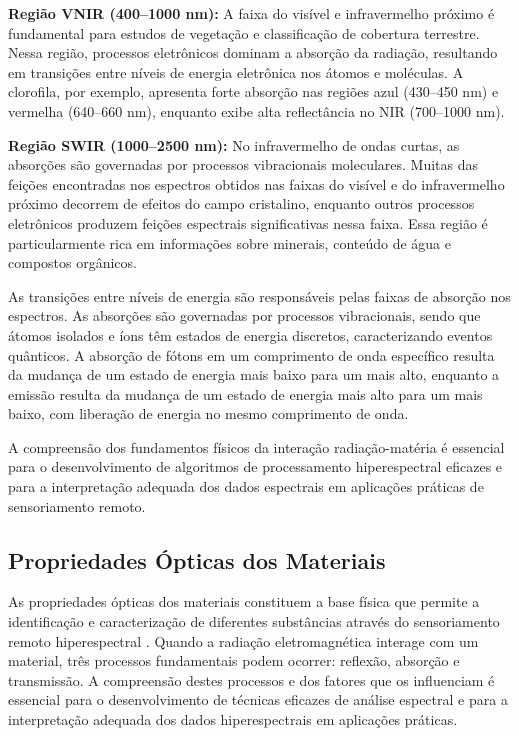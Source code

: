 \textbf{Região VNIR (400--1000 nm):} A faixa do visível e infravermelho
próximo é fundamental para estudos de vegetação e classificação de cobertura
terrestre. Nessa região, processos eletrônicos dominam a absorção da radiação,
resultando em transições entre níveis de energia eletrônica nos átomos e
moléculas. A clorofila, por exemplo, apresenta forte absorção nas regiões azul
(430--450 nm) e vermelha (640--660 nm), enquanto exibe alta reflectância no NIR
(700--1000 nm).

\textbf{Região SWIR (1000--2500 nm):} No infravermelho de ondas curtas, as
absorções são governadas por processos vibracionais moleculares. Muitas das
feições encontradas nos espectros obtidos nas faixas do visível e do
infravermelho próximo decorrem de efeitos do campo cristalino, enquanto outros
processos eletrônicos produzem feições espectrais significativas nessa faixa.
Essa região é particularmente rica em informações sobre minerais, conteúdo de
água e compostos orgânicos.

As transições entre níveis de energia são responsáveis pelas faixas de absorção
nos espectros. As absorções são governadas por processos vibracionais, sendo
que átomos isolados e íons têm estados de energia discretos, caracterizando
eventos quânticos. A absorção de fótons em um comprimento de onda específico
resulta da mudança de um estado de energia mais baixo para um mais alto,
enquanto a emissão resulta da mudança de um estado de energia mais alto para um
mais baixo, com liberação de energia no mesmo comprimento de onda.

A compreensão dos fundamentos físicos da interação radiação-matéria é essencial
para o desenvolvimento de algoritmos de processamento hiperespectral eficazes e
para a interpretação adequada dos dados espectrais em aplicações práticas de
sensoriamento remoto.


\subsection{Propriedades Ópticas dos Materiais}
\label{subsec:propriedades_opticas}

As propriedades ópticas dos materiais constituem a base física que permite 
a identificação e caracterização de diferentes substâncias através do 
sensoriamento remoto hiperespectral \cite{Baptista2019}. Quando a 
radiação eletromagnética interage com um material, três processos 
fundamentais podem ocorrer: reflexão, absorção e transmissão. A compreensão 
destes processos e dos fatores que os influenciam é essencial para o 
desenvolvimento de técnicas eficazes de análise espectral e para a 
interpretação adequada dos dados hiperespectrais em aplicações práticas.

